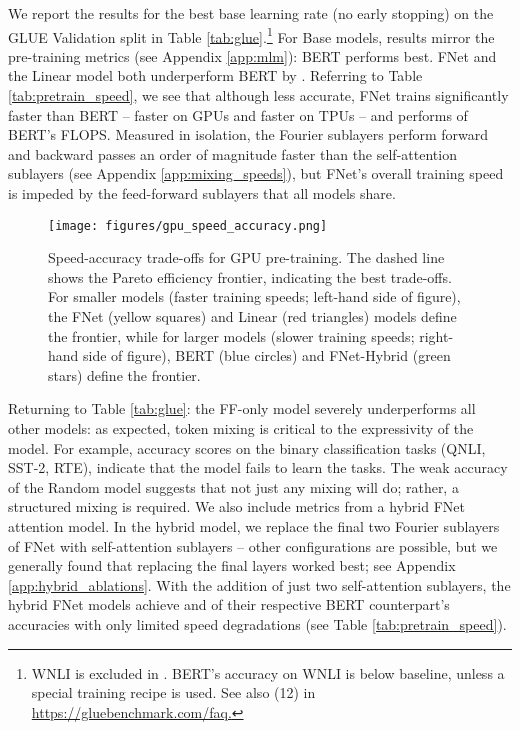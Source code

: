 \documentclass[11pt]{article}
\begin{document}
We report the results for the best base learning rate (no early stopping) on the GLUE Validation split in Table \ref{tab:glue}.\footnote{WNLI is excluded in \citet{devlin2018bert}. BERT’s accuracy on WNLI is below baseline, unless a special training recipe is used. See also (12) in \url{https://gluebenchmark.com/faq.}}
For Base models, results mirror the pre-training metrics (see Appendix \ref{app:mlm}): BERT performs best. FNet and the Linear model both  underperform BERT by . Referring to Table \ref{tab:pretrain_speed}, we see that although less accurate, FNet trains significantly faster than BERT --  faster on GPUs and  faster on TPUs -- and performs  of BERT's FLOPS. Measured in isolation, the Fourier sublayers perform forward and backward passes an order of magnitude faster than the self-attention sublayers (see Appendix \ref{app:mixing_speeds}), but FNet's overall training speed is impeded by the feed-forward sublayers that all models share.

\begin{figure*}[tb]
    \centering
    \texttt{[image: figures/gpu\_speed\_accuracy.png]}
    \caption{
    Speed-accuracy trade-offs for GPU pre-training. The dashed line shows the Pareto efficiency frontier, indicating the best trade-offs. For smaller models (faster training speeds; left-hand side of figure), the FNet (yellow squares) and Linear (red triangles) models define the frontier, while for larger models (slower training speeds; right-hand side of figure), BERT (blue circles) and FNet-Hybrid (green stars) define the frontier.}
    \label{fig:gpu_speed_accuracy}
\end{figure*}

Returning to Table \ref{tab:glue}: the FF-only model severely underperforms all other models: as expected, token mixing is critical to the expressivity of the model. For example,  accuracy scores on the binary classification tasks (QNLI, SST-2, RTE), indicate that the model fails to learn the tasks. The weak accuracy of the Random model suggests that not just any mixing will do; rather, a structured mixing is required. We also include metrics from a hybrid FNet attention model. In the hybrid model, we replace the final two Fourier sublayers of FNet with self-attention sublayers -- other configurations are possible, but we generally found that replacing the final layers worked best; see Appendix \ref{app:hybrid_ablations}. With the addition of just two self-attention sublayers, the hybrid FNet models achieve  and  of their respective BERT counterpart's accuracies with only limited speed degradations (see Table \ref{tab:pretrain_speed}).
\end{document}
